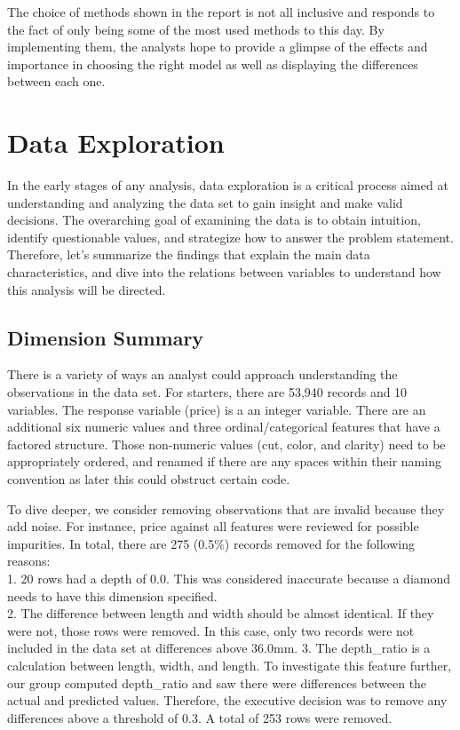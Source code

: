 \documentclass[
  paper=a4,
  ,captions=tableheading
]{scrartcl}
\begin{document}
The choice of methods shown in the report is not all inclusive and
responds to the fact of only being some of the most used methods to this
day. By implementing them, the analysts hope to provide a glimpse of the
effects and importance in choosing the right model as well as displaying
the differences between each one.

\hypertarget{data-exploration}{%
\section{Data Exploration}\label{data-exploration}}

In the early stages of any analysis, data exploration is a critical
process aimed at understanding and analyzing the data set to gain
insight and make valid decisions. The overarching goal of examining the
data is to obtain intuition, identify questionable values, and
strategize how to answer the problem statement. Therefore, let's
summarize the findings that explain the main data characteristics, and
dive into the relations between variables to understand how this
analysis will be directed.

\hypertarget{dimension-summary}{%
\subsection{Dimension Summary}\label{dimension-summary}}

There is a variety of ways an analyst could approach understanding the
observations in the data set. For starters, there are 53,940 records and
10 variables. The response variable (price) is a an integer variable.
There are an additional six numeric values and three ordinal/categorical
features that have a factored structure. Those non-numeric values (cut,
color, and clarity) need to be appropriately ordered, and renamed if
there are any spaces within their naming convention as later this could
obstruct certain code.

To dive deeper, we consider removing observations that are invalid
because they add noise. For instance, price against all features were
reviewed for possible impurities. In total, there are 275 (0.5\%)
records removed for the following reasons:\\
1. 20 rows had a depth of 0.0. This was considered inaccurate because a
diamond needs to have this dimension specified.\\
2. The difference between length and width should be almost identical.
If they were not, those rows were removed. In this case, only two
records were not included in the data set at differences above 36.0mm.
3. The depth\_ratio is a calculation between length, width, and length.
To investigate this feature further, our group computed depth\_ratio and
saw there were differences between the actual and predicted values.
Therefore, the executive decision was to remove any differences above a
threshold of 0.3. A total of 253 rows were removed.
\end{document}
